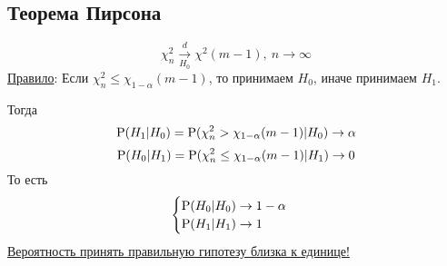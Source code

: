 \subsection{Теорема Пирсона}
\[ \chi_n^2\xrightarrow[H_0]{d}\chi^2(m-1),\ n\rightarrow\infty \]
\underline{Правило}: Если $\chi_n^2\leq\chi_{1-\alpha}(m-1)$, то принимаем $H_0$,
иначе принимаем $H_1$.
\begin{remark*} Тогда
    \[\P(H_1\vert H_0)=\P(\chi^2_n>\chi_{1-\alpha}(m-1)\vert H_0)\rightarrow\alpha\]
    \[\P(H_0\vert H_1)=\P(\chi^2_n\leq\chi_{1-\alpha}(m-1)\vert H_1)\rightarrow0\]
    То есть
    \[\begin{cases}
        \P(H_0\vert H_0)\rightarrow1-\alpha \\
        \P(H_1\vert H_1)\rightarrow1
    \end{cases}\]
    \underline{Вероятность принять правильную гипотезу близка к единице!}
\end{remark*}
